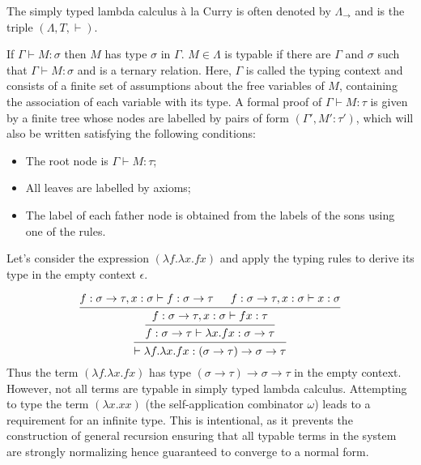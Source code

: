 The simply typed lambda calculus à la Curry is often denoted by $\Lambda_\rightarrow$ and is the triple $(\Lambda, T, \vdash)$. 

If $\Gamma \vdash M: \sigma$ then $M$ has type $\sigma$ in $\Gamma$. $M \in \Lambda$ is typable if there are $\Gamma$ and $\sigma$ such that $\Gamma \vdash M: \sigma$ and is a ternary relation. Here, $\Gamma$ is called the typing context and consists of a finite set of assumptions about the free variables of $M$, containing the association of each variable with its type. A formal proof of $\Gamma \vdash M: \tau $ is given by a finite tree whose nodes are labelled by pairs of form $(\Gamma', M': \tau')$, which will also be written satisfying the following conditions:
\begin{itemize}
    \item The root node is $\Gamma \vdash M: \tau$;
    \item All leaves are labelled by axioms;
    \item The label of each father node is obtained from the labels of the sons using one of the rules.
\end{itemize}
Let's consider the expression $(\lambda f.\lambda x.fx)$ and apply the typing rules to derive its type in the empty context $\epsilon$.

\begin{gather*}
\begin{prooftree}
\hypo[]{f: \sigma \to \tau, x: \sigma \vdash f: \sigma \to \tau}
\hypo[]{f: \sigma \to \tau, x: \sigma \vdash x: \sigma}
\infer2[]{f: \sigma \to \tau, x: \sigma \vdash f x: \tau}
\infer1[]{f: \sigma \to \tau \vdash \lambda x. fx: \sigma \to \tau}
\infer1[]{\vdash \lambda f.\lambda x.fx: (\sigma \to \tau) \to \sigma \to \tau}
\end{prooftree}
\end{gather*}
Thus the term $(\lambda f.\lambda x.fx)$ has type $(\sigma \to \tau) \to \sigma \to \tau$ in the empty context. However, not all terms are typable in simply typed lambda calculus. Attempting to type the term $(\lambda x.xx)$ (the self-application combinator $\omega$) leads to a requirement for an infinite type. This is intentional, as it prevents the construction of general recursion ensuring that all typable terms in the system are strongly normalizing hence guaranteed to converge to a normal form.

